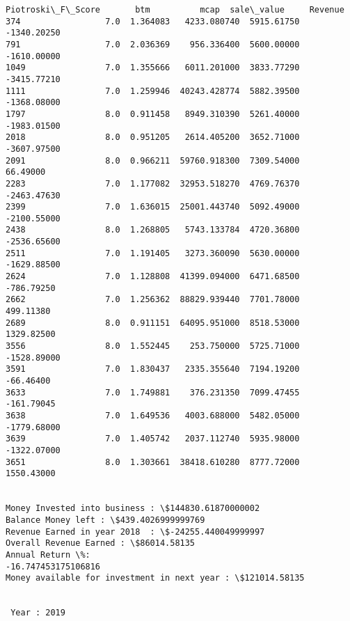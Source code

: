 \documentclass[11pt]{article}
\begin{document}
\begin{Verbatim}[commandchars=\\\{\}]
      Piotroski\_F\_Score       btm          mcap  sale\_value     Revenue
374                 7.0  1.364083   4233.080740  5915.61750 -1340.20250
791                 7.0  2.036369    956.336400  5600.00000 -1610.00000
1049                7.0  1.355666   6011.201000  3833.77290 -3415.77210
1111                7.0  1.259946  40243.428774  5882.39500 -1368.08000
1797                8.0  0.911458   8949.310390  5261.40000 -1983.01500
2018                8.0  0.951205   2614.405200  3652.71000 -3607.97500
2091                8.0  0.966211  59760.918300  7309.54000    66.49000
2283                7.0  1.177082  32953.518270  4769.76370 -2463.47630
2399                7.0  1.636015  25001.443740  5092.49000 -2100.55000
2438                8.0  1.268805   5743.133784  4720.36800 -2536.65600
2511                7.0  1.191405   3273.360090  5630.00000 -1629.88500
2624                7.0  1.128808  41399.094000  6471.68500  -786.79250
2662                7.0  1.256362  88829.939440  7701.78000   499.11380
2689                8.0  0.911151  64095.951000  8518.53000  1329.82500
3556                8.0  1.552445    253.750000  5725.71000 -1528.89000
3591                7.0  1.830437   2335.355640  7194.19200   -66.46400
3633                7.0  1.749881    376.231350  7099.47455  -161.79045
3638                7.0  1.649536   4003.688000  5482.05000 -1779.68000
3639                7.0  1.405742   2037.112740  5935.98000 -1322.07000
3651                8.0  1.303661  38418.610280  8777.72000  1550.43000


Money Invested into business : \$144830.61870000002
Balance Money left : \$439.4026999999769
Revenue Earned in year 2018  : \$-24255.440049999997
Overall Revenue Earned : \$86014.58135
Annual Return \%:
-16.747453175106816
Money available for investment in next year : \$121014.58135


 Year : 2019


\end{Verbatim}
\end{document}
